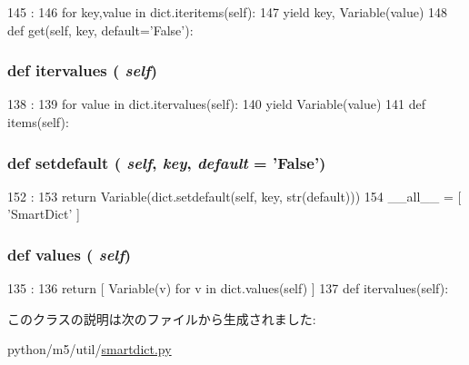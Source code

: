 \begin{DoxyCode}
145                        :
146         for key,value in dict.iteritems(self):
147             yield key, Variable(value)
148 
    def get(self, key, default='False'):
\end{DoxyCode}
\hypertarget{classm5_1_1util_1_1smartdict_1_1SmartDict_aeb6e8630a10560ad0d4b34377c790f19}{
\subsubsection[{itervalues}]{\setlength{\rightskip}{0pt plus 5cm}def itervalues ( {\em self})}}
\label{classm5_1_1util_1_1smartdict_1_1SmartDict_aeb6e8630a10560ad0d4b34377c790f19}



\begin{DoxyCode}
138                         :
139         for value in dict.itervalues(self):
140             yield Variable(value)
141 
    def items(self):
\end{DoxyCode}
\hypertarget{classm5_1_1util_1_1smartdict_1_1SmartDict_a1af96fe42a8e8c54a0c606fb4f01df98}{
\subsubsection[{setdefault}]{\setlength{\rightskip}{0pt plus 5cm}def setdefault ( {\em self}, \/   {\em key}, \/   {\em default} = {\ttfamily 'False'})}}
\label{classm5_1_1util_1_1smartdict_1_1SmartDict_a1af96fe42a8e8c54a0c606fb4f01df98}



\begin{DoxyCode}
152                                               :
153         return Variable(dict.setdefault(self, key, str(default)))
154 
__all__ = [ 'SmartDict' ]
\end{DoxyCode}
\hypertarget{classm5_1_1util_1_1smartdict_1_1SmartDict_abb73a0060caeba53780d972f37623f1e}{
\subsubsection[{values}]{\setlength{\rightskip}{0pt plus 5cm}def values ( {\em self})}}
\label{classm5_1_1util_1_1smartdict_1_1SmartDict_abb73a0060caeba53780d972f37623f1e}



\begin{DoxyCode}
135                     :
136         return [ Variable(v) for v in dict.values(self) ]
137 
    def itervalues(self):
\end{DoxyCode}


このクラスの説明は次のファイルから生成されました:\begin{DoxyCompactItemize}
\item 
python/m5/util/\hyperlink{smartdict_8py}{smartdict.py}\end{DoxyCompactItemize}
